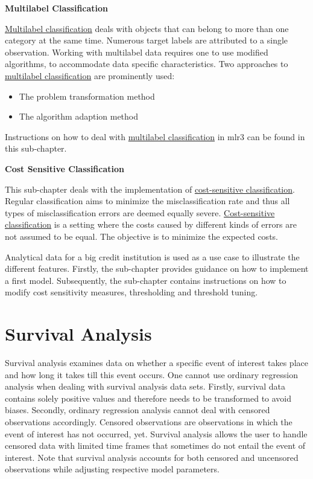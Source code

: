 \documentclass[12pt,]{scrbook}
\providecommand{\tightlist}{%
  \setlength{\itemsep}{0pt}\setlength{\parskip}{0pt}}
\begin{document}
\textbf{Multilabel Classification}

\protect\hyperlink{multilabel}{Multilabel classification} deals with objects that can belong to more than one category at the same time.
Numerous target labels are attributed to a single observation.
Working with multilabel data requires one to use modified algorithms, to accommodate data specific characteristics.
Two approaches to \protect\hyperlink{multilabel}{multilabel classification} are prominently used:

\begin{itemize}
\tightlist
\item
  The problem transformation method
\item
  The algorithm adaption method
\end{itemize}

Instructions on how to deal with \protect\hyperlink{multilabel}{multilabel classification} in mlr3 can be found in this sub-chapter.

\textbf{Cost Sensitive Classification}

This sub-chapter deals with the implementation of \protect\hyperlink{cost-sens}{cost-sensitive classification}.
Regular classification aims to minimize the misclassification rate and thus all types of misclassification errors are deemed equally severe.
\protect\hyperlink{cost-sens}{Cost-sensitive classification} is a setting where the costs caused by different kinds of errors are not assumed to be equal.
The objective is to minimize the expected costs.

Analytical data for a big credit institution is used as a use case to illustrate the different features.
Firstly, the sub-chapter provides guidance on how to implement a first model.
Subsequently, the sub-chapter contains instructions on how to modify cost sensitivity measures, thresholding and threshold tuning.

\hypertarget{survival}{%
\section{Survival Analysis}\label{survival}}

Survival analysis examines data on whether a specific event of interest takes place and how long it takes till this event occurs.
One cannot use ordinary regression analysis when dealing with survival analysis data sets.
Firstly, survival data contains solely positive values and therefore needs to be transformed to avoid biases.
Secondly, ordinary regression analysis cannot deal with censored observations accordingly.
Censored observations are observations in which the event of interest has not occurred, yet.
Survival analysis allows the user to handle censored data with limited time frames that sometimes do not entail the event of interest.
Note that survival analysis accounts for both censored and uncensored observations while adjusting respective model parameters.
\end{document}
